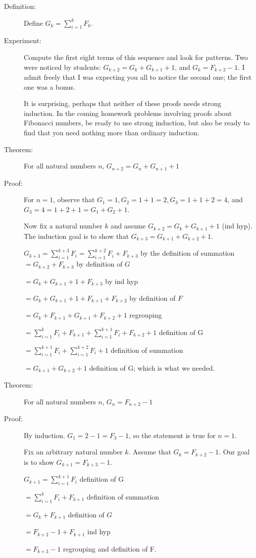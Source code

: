 \documentclass[12pt]{article}
\begin{document}
\begin{description}
\item[Definition:]  Define $G_k=\sum_{i=1}^k F_k$.

\item[Experiment:]  Compute the first eight terms of this sequence and look for patterns.  Two were noticed by students:
$G_{k+2}= G_k+G_{k+1}+1$, and $G_k = F_{k+2}-1$.  I admit freely that I was expecting you all to notice the second one;  the first one was a bonus.

It is surprising, perhaps that neither of these proofs needs strong induction.  In the coming homework problems involving proofs about Fibonacci numbers, be ready to use strong induction, but also be ready to find that you need nothing more than ordinary induction.

\item[Theorem:]  For all  natural numbers $n$, $G_{n+2} = G_n+G_{n+1}+1$

\item[Proof:]  For $n=1$, observe that $G_1=1, G_2=1+1=2, G_3=1+1+2=4$, and $G_3 = 4 = 1+2+1 = G_1+G_2+1$.

Now fix a natural number $k$ and assume $G_{k+2} = G_k+G_{k+1}+1$ (ind hyp).  The induction goal is
to show that $G_{k+3} = G_{k+1}+G_{k+2}+1$.

$G_{k+3} = \sum_{i=1}^{k+3}F_i = \sum_{i=1}^{k+2}F_i + F_{k+3}$ by the definition of summation
$=G_{k+2} + F_{k+3}$ by definition of $G$

$= G_k+G_{k+1}+1+F_{k+3}$ by ind hyp

$= G_k + G_{k+1}+ 1+F_{k+1}+F_{k+2}$ by definition of $F$

$= G_k+F_{k+1}  + G_{k+1}+F_{k+2}+1$ regrouping

$= \sum_{i=1}^kF_i+F_{k+1}  +\sum_{i=1}^{k+1}F_i +F_{k+2}+1$ definition of G

$= \sum_{i=1}^{k+1}F_i  +\sum_{i=1}^{k+2}F_i +1$ definition of summation

$= G_{k+1}+G_{k+2}+1$ definition of G; which is what we needed.

\item[Theorem:]  For all natural numbers $n$, $G_n=F_{n+2}-1$

\item[Proof:]  By induction.  $G_1 = 2-1 = F_3-1$, so the statement is true for $n=1$.

Fix an arbitrary natural number $k$.  Assume that $G_k = F_{k+2}-1$.   Our goal is to show $G_{k+1}=F_{k+3}-1$.

$G_{k+1} = \sum_{i=1}^{k+1}F_i$  definition of G

$= \sum_{i=1}^{k}F_i + F_{k+1}$  definition of summation

$= G_k + F_{k+1}$  definition of $G$

$= F_{k+2}-1 + F_{k+1}$  ind hyp

$ = F_{k+3}-1$ regrouping and definition of F.

\end{description}
\end{document}
